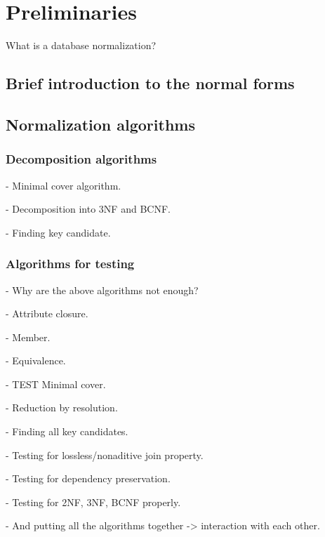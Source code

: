 \chapter{Preliminaries}
\label{chap:preliminaries}
What is a database normalization?
\section{Brief introduction to the normal forms}
\label{sec:nfintro}
\section{Normalization algorithms}
\label{sec:alg}
\subsection{Decomposition algorithms}

- Minimal cover algorithm.

- Decomposition into 3NF and BCNF.

- Finding key candidate.

\subsection{Algorithms for testing}

- Why are the above algorithms not enough?

- Attribute closure.

- Member.

- Equivalence.

- TEST Minimal cover.

- Reduction by resolution.

- Finding all key candidates.

- Testing for lossless/nonaditive join property.

- Testing for dependency preservation. 

- Testing for 2NF, 3NF, BCNF properly.

- And putting all the algorithms together -> interaction with each other.
